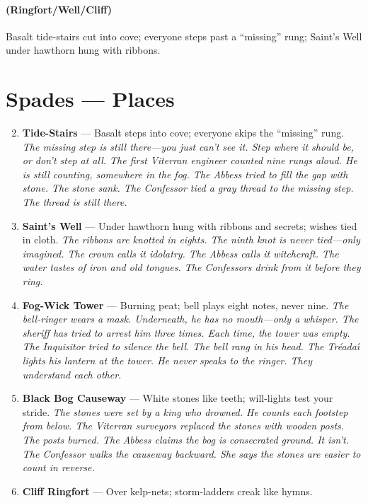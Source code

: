 \paragraph*{(Ringfort/Well/Cliff)} Basalt tide-stairs cut into cove; everyone steps past a ``missing'' rung; Saint's Well under hawthorn hung with ribbons.

\section*{Spades --- Places}
\label{sec:theona-places}
\begin{enumerate}
\setcounter{enumi}{1}
\item \textbf{Tide-Stairs} --- Basalt steps into cove; everyone skips the ``missing'' rung.
  \hfill \textit{The missing step is still there---you just can't see it. Step where it should be, or don't step at all. The first Viterran engineer counted nine rungs aloud. He is still counting, somewhere in the fog. The Abbess tried to fill the gap with stone. The stone sank. The Confessor tied a gray thread to the missing step. The thread is still there.}
\item \textbf{Saint's Well} --- Under hawthorn hung with ribbons and secrets; wishes tied in cloth.
  \hfill \textit{The ribbons are knotted in eights. The ninth knot is never tied---only imagined. The crown calls it idolatry. The Abbess calls it witchcraft. The water tastes of iron and old tongues. The Confessors drink from it before they ring.}
\item \textbf{Fog-Wick Tower} --- Burning peat; bell plays eight notes, never nine.
  \hfill \textit{The bell-ringer wears a mask. Underneath, he has no mouth---only a whisper. The sheriff has tried to arrest him three times. Each time, the tower was empty. The Inquisitor tried to silence the bell. The bell rang in his head. The Tr\'eada\'{\i} lights his lantern at the tower. He never speaks to the ringer. They understand each other.}
\item \textbf{Black Bog Causeway} --- White stones like teeth; will-lights test your stride.
  \hfill \textit{The stones were set by a king who drowned. He counts each footstep from below. The Viterran surveyors replaced the stones with wooden posts. The posts burned. The Abbess claims the bog is consecrated ground. It isn't. The Confessor walks the causeway backward. She says the stones are easier to count in reverse.}
\item \textbf{Cliff Ringfort} --- Over kelp-nets; storm-ladders creak like hymns.

\end{enumerate}
